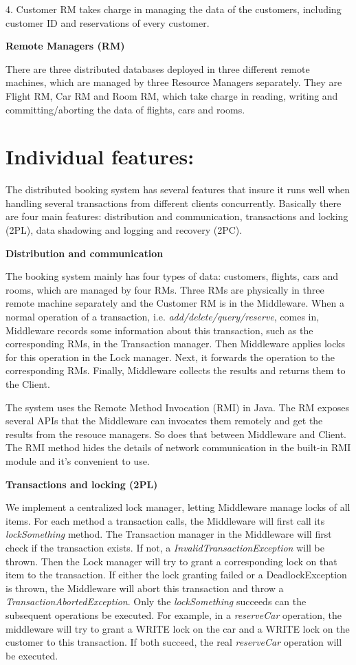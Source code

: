 \documentclass[a4paper, 12pt]{article}
\newcommand{\newQuestion}[1]{\section{#1}}
\newcommand{\newPart}[1]{\textbf{\large #1}}
\begin{document}
4. Customer RM takes charge in managing the data of the customers, including customer ID and reservations of every customer.

\newPart{Remote Managers (RM)}

There are three distributed databases deployed in three different remote machines, which are managed by three Resource Managers separately. They are Flight RM, Car RM and Room RM, which take charge in reading, writing and committing/aborting the data of flights, cars and rooms.

\newQuestion{Individual features:}

The distributed booking system has several features that insure it runs well when handling several transactions from different clients concurrently. Basically there are four main features: distribution and communication, transactions and locking (2PL), data shadowing and logging and recovery (2PC).

\newPart{Distribution and communication}

The booking system mainly has four types of data: customers, flights, cars and rooms, which are managed by four RMs. Three RMs are physically in three remote machine separately and the Customer RM is in the Middleware. When a normal operation of a transaction, i.e. \textit{add/delete/query/reserve}, comes in, Middleware records some information about this transaction, such as the corresponding RMs, in the Transaction manager. Then Middleware applies locks for this operation in the Lock manager. Next, it forwards the operation to the corresponding RMs. Finally, Middleware collects the results and returns them to the Client.

The system uses the Remote Method Invocation (RMI) in Java. The RM exposes several APIs that the Middleware can invocates them remotely and get the results from the resouce managers. So does that between Middleware and Client. The RMI method hides the details of network communication in the built-in RMI module and it's convenient to use.

\newPart{Transactions and locking (2PL)}

We implement a centralized lock manager, letting Middleware manage locks of all items. For each method a transaction calls, the Middleware will first call its \textit{lockSomething} method. The Transaction manager in the Middleware will first check if the transaction exists. If not, a \textit{InvalidTransactionException} will be thrown. Then the Lock manager will try to grant a corresponding lock on that item to the transaction. If either the lock granting failed or a DeadlockException is thrown, the Middleware will abort this transaction and throw a \textit{TransactionAbortedException}. Only the \textit{lockSomething} succeeds can the subsequent operations be executed. For example, in a \textit{reserveCar} operation, the middleware will try to grant a WRITE lock on the car and  a WRITE lock on the customer to this transaction. If both succeed, the real \textit{reserveCar} operation will be executed.
\end{document}
